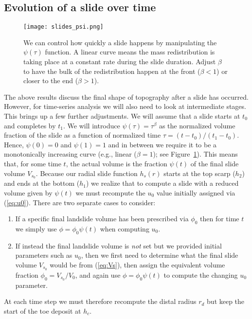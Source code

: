 \documentclass[12pt,letterpaper,margin=0.5in]{report}
\begin{document}
\subsection{Evolution of a slide over time}

\begin{figure}[h!]
  \centering
  \texttt{[image: slides\_psi.png]}
  \caption{We can control how quickly a slide happens by manipulating the $\psi(\tau)$ function. A
  linear curve means the mass redistribution is taking place at a constant rate during the slide duration.
  Adjust $\beta$ to have the bulk of the redistribution happen at the front ($\beta < 1$) or closer
  to the end ($\beta > 1$).}
  \label{slides_psi}
\end{figure}

The above results discuss the final shape of topography after a slide has occurred.  However, for time-series analysis
we will also need to look at intermediate stages.  This brings up a few further adjustments. We will assume that a
slide starts at $t_0$ and completes by $t_1$.  We will introduce $\psi(\tau) = \tau^\beta$ as the normalized volume fraction of the slide
as a function of normalized time $\tau = (t - t_0)/(t_1 - t_0)$.  Hence, $\psi(0) = 0$ and $\psi(1) = 1$ and
in between we require it to be a monotonically increasing curve (e.g., linear ($\beta = 1$); see Figure~\ref{slides_psi}).  This means that, for some time $t$, the actual
volume is the fraction $\psi(t)$ of the final slide volume $V_{s_0}$. Because our radial slide function $h_s(r)$ starts at the top scarp ($h_2$) and
ends at the bottom ($h_1$) we realize that to compute a slide with a reduced volume given by $\psi(t)$ we must
recompute the $u_0$ value initially assigned via (\ref{eq:u0}). There are two separate cases to consider:
\begin{enumerate}
  \item If a specific final landslide volume has been prescribed via $\phi_0$ then for time $t$ we simply use $\phi = \phi_0 \psi(t)$
  when computing $u_0$.
  \item If instead the final landslide volume is \emph{not} set but we provided initial parameters such as $u_0$, then we first need to determine
  what the final slide volume $V_{s_0}$ would be from (\ref{eq:Vs}), then assign the equivalent volume fraction  $\phi_0 = V_{s_0}/V_0$, and
  again use $\phi = \phi_0 \psi(t)$ to compute the changing $u_0$ parameter.
\end{enumerate}
At each time step we must therefore recompute the distal radius $r_d$ but keep the start of the toe deposit at $h_c$.
\end{document}
